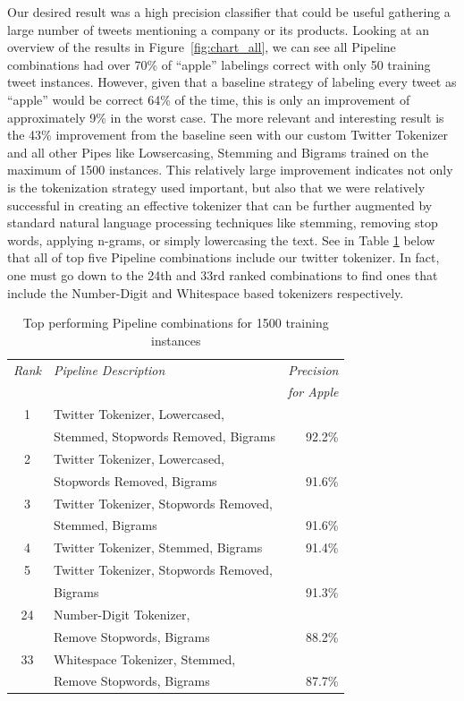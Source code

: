 \documentclass[letterpaper]{article}
\begin{document}
Our desired result was a high precision classifier that could be useful gathering a large number of tweets mentioning a company or its products. Looking at an overview of the results in Figure~\ref{fig:chart_all}, we can see all Pipeline combinations had over 70\% of ``apple'' labelings correct with only 50 training tweet instances. However, given that a baseline strategy of labeling every tweet as ``apple'' would be correct 64\% of the time, this is only an improvement of approximately 9\% in the worst case. The more relevant and interesting result is the 43\% improvement from the baseline seen with our custom Twitter Tokenizer and all other Pipes like Lowsercasing, Stemming and Bigrams trained on the maximum of 1500 instances. This relatively large improvement indicates not only is the tokenization strategy used important, but also that we were relatively successful in creating an effective tokenizer that can be further augmented by standard natural language processing techniques like stemming, removing stop words, applying n-grams, or simply lowercasing the text. See in Table \ref{tab:top_pipelines} below that all of top five Pipeline combinations include our twitter tokenizer. In fact, one must go down to the 24th and 33rd ranked combinations to find ones that include the Number-Digit and Whitespace based tokenizers respectively.

\begin{table}[h]
\centering
\small
\begin{tabular}{|c|l|r|}
	\hline
	\textit{Rank} & \textit{Pipeline Description} & \textit{Precision} \\
	& & \textit{for Apple} \\ \hline
	1 & Twitter Tokenizer, Lowercased, & \\ & Stemmed, Stopwords Removed, Bigrams & 92.2\% \\ \hline
	2 & Twitter Tokenizer, Lowercased, & \\ & Stopwords Removed, Bigrams & 91.6\% \\ \hline
	3 & Twitter Tokenizer, Stopwords Removed, & \\ & Stemmed, Bigrams & 91.6\% \\ \hline
	4 & Twitter Tokenizer, Stemmed, Bigrams & 91.4\% \\ \hline
	5 & Twitter Tokenizer, Stopwords Removed, & \\ & Bigrams & 91.3\% \\ \hline
	\hline
	24 & Number-Digit Tokenizer, & \\ & Remove Stopwords, Bigrams & 88.2\% \\ \hline
	\hline
	33 & Whitespace Tokenizer, Stemmed, & \\ & Remove Stopwords, Bigrams & 87.7\% \\ \hline

\end{tabular}
\caption{Top performing Pipeline combinations for 1500 training instances}
\label{tab:top_pipelines}
\end{table}
\end{document}

